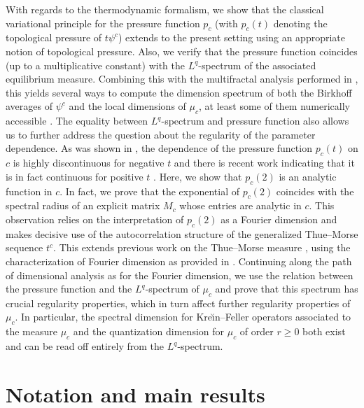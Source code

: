 \documentclass[11pt,reqno]{amsart}
\theoremstyle{plain}
\theoremstyle{definition}
\newcommand{\ts}{\hspace{0.5pt}}
\begin{document}
With regards to the thermodynamic formalism, we show that the classical variational principle for the pressure function $p_c$ (with $p_c(t)$ denoting  the topological pressure of $t\psi^c$) extends to the present setting using an appropriate notion of topological pressure. Also, we verify that the pressure function coincides (up to a multiplicative constant) with the $L^q$-spectrum of the associated equilibrium measure. Combining this with the multifractal analysis performed in \cite{fan_generalized_2020}, this yields several ways to compute the dimension spectrum of both the Birkhoff averages of $\psi^c$ and the local dimensions of $\mu_c$, at least some of them numerically accessible \cite{BGKS}.
The equality between $L^q$-spectrum and pressure function also allows us to further address the question about the regularity of the parameter dependence. As was shown in \cite{fan_generalized_2020}, the dependence of the pressure function $p_c(t)$ on $c$ is highly discontinuous for negative $t$ and there is recent work indicating that it is in fact continuous for positive $t$ \cite{GLSprep}. 
Here, we show that $p_c(2)$ is an analytic function in $c$. In fact, we prove that the exponential of $p_c(2)$ coincides with the spectral radius of an explicit matrix $M_c$ whose entries are analytic in $c$. This observation relies on the interpretation of $p_c(2)$ as a Fourier dimension and makes decisive use of the autocorrelation structure of the generalized Thue{\ts}--Morse sequence $t^c$.
This extends previous work on the Thue{\ts}--Morse measure \cite{Zaks}, using the characterization of Fourier dimension as provided in \cite{Strichartz}.
Continuing along the path of dimensional analysis as for the Fourier dimension,   we use the relation between the pressure function  and  the $L^q$-spectrum of $\mu_c$ and prove that this spectrum has crucial regularity properties, which in turn affect further regularity properties of $\mu_c$.
In particular, the spectral dimension for Kre\u{\i}n--Feller operators associated to the measure $\mu_c$ and the quantization dimension for $\mu_c$ of order $r\geqslant 0$ both exist and can be read off entirely from the $L^q$-spectrum.




\section{Notation and main results}
\end{document}
